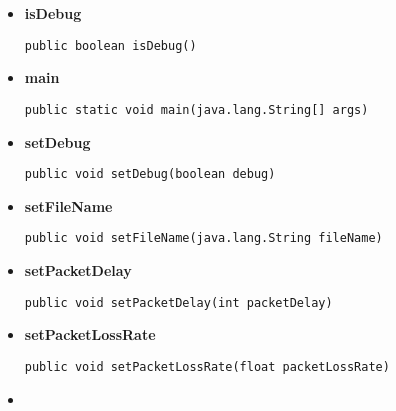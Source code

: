 {{{{\begin{itemize}
{\begin{lstlisting}[frame=none]
public java.lang.String getServer()\end{lstlisting} %
}%
\item{ 
\hypertarget{fjs.filetransfer.udp.Client.isDebug()}{{\bf  isDebug}\\}
\begin{lstlisting}[frame=none]
public boolean isDebug()\end{lstlisting} %
}%
\item{ 
\hypertarget{fjs.filetransfer.udp.Client.main(java.lang.String[])}{{\bf  main}\\}
\begin{lstlisting}[frame=none]
public static void main(java.lang.String[] args)\end{lstlisting} %
}%
\item{ 
\hypertarget{fjs.filetransfer.udp.Client.setDebug(boolean)}{{\bf  setDebug}\\}
\begin{lstlisting}[frame=none]
public void setDebug(boolean debug)\end{lstlisting} %
}%
\item{ 
\hypertarget{fjs.filetransfer.udp.Client.setFileName(java.lang.String)}{{\bf  setFileName}\\}
\begin{lstlisting}[frame=none]
public void setFileName(java.lang.String fileName)\end{lstlisting} %
}%
\item{ 
\hypertarget{fjs.filetransfer.udp.Client.setPacketDelay(int)}{{\bf  setPacketDelay}\\}
\begin{lstlisting}[frame=none]
public void setPacketDelay(int packetDelay)\end{lstlisting} %
}%
\item{ 
\hypertarget{fjs.filetransfer.udp.Client.setPacketLossRate(float)}{{\bf  setPacketLossRate}\\}
\begin{lstlisting}[frame=none]
public void setPacketLossRate(float packetLossRate)\end{lstlisting} %
}%
\item{ 
}
\end{itemize}}}}}
